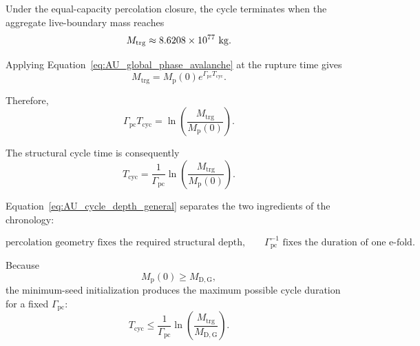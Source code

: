Under the equal-capacity percolation closure, the cycle terminates when the
aggregate live-boundary mass reaches
\begin{equation}
    M_{\mathrm{trg}}
    \approx
    8.6208\times10^{77}
    \ {\rm kg}.
\end{equation}

Applying
Equation~\eqref{eq:AU_global_phase_avalanche}
at the rupture time gives
\begin{equation}
    M_{\mathrm{trg}}
    =
    M_{\mathrm p}(0)
    e^{\Gamma_{\mathrm{pc}}T_{\mathrm{cyc}}}.
\end{equation}

Therefore,
\begin{equation}
    \boxed{
    \Gamma_{\mathrm{pc}}
    T_{\mathrm{cyc}}
    =
    \ln
    \left(
        \frac{
            M_{\mathrm{trg}}
        }{
            M_{\mathrm p}(0)
        }
    \right).
    }
    \label{eq:AU_cycle_depth_general}
\end{equation}

The structural cycle time is consequently
\begin{equation}
    \boxed{
    T_{\mathrm{cyc}}
    =
    \frac{
        1
    }{
        \Gamma_{\mathrm{pc}}
    }
    \ln
    \left(
        \frac{
            M_{\mathrm{trg}}
        }{
            M_{\mathrm p}(0)
        }
    \right).
    }
    \label{eq:AU_cycle_time_general}
\end{equation}

Equation~\eqref{eq:AU_cycle_depth_general}
separates the two ingredients of the chronology:

\begin{equation}
    \boxed{
    \text{percolation geometry fixes the required structural depth,}
    \qquad
    \Gamma_{\mathrm{pc}}^{-1}
    \text{ fixes the duration of one e-fold}.
    }
\end{equation}

Because
\begin{equation}
    M_{\mathrm p}(0)
    \geq
    M_{\mathrm{D,G}},
\end{equation}
the minimum-seed initialization produces the maximum possible cycle duration
for a fixed
\(\Gamma_{\mathrm{pc}}\):
\begin{equation}
    T_{\mathrm{cyc}}
    \leq
    \frac{
        1
    }{
        \Gamma_{\mathrm{pc}}
    }
    \ln
    \left(
        \frac{
            M_{\mathrm{trg}}
        }{
            M_{\mathrm{D,G}}
        }
    \right).
\end{equation}

